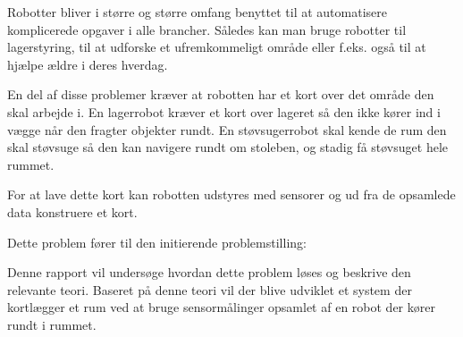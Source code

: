 Robotter bliver i større og større omfang benyttet til at automatisere komplicerede opgaver i alle brancher.\cite{robotter_i_alle_brancher}
Således kan man bruge robotter til lagerstyring, til at udforske et ufremkommeligt område eller f.eks. også til at hjælpe ældre i deres hverdag.

En del af disse problemer kræver at robotten har et kort over det område den skal arbejde i.
En lagerrobot kræver et kort over lageret så den ikke kører ind i vægge når den fragter objekter rundt.
En støvsugerrobot skal kende de rum den skal støvsuge så den kan navigere rundt om stoleben, og stadig få støvsuget hele rummet.

For at lave dette kort kan robotten udstyres med sensorer og ud fra de opsamlede data konstruere et kort.

Dette problem fører til den initierende problemstilling:

Denne rapport vil undersøge hvordan dette problem løses og beskrive den relevante teori.
Baseret på denne teori vil der blive udviklet et system der kortlægger et rum ved at bruge sensormålinger opsamlet af en robot der kører rundt i rummet.
